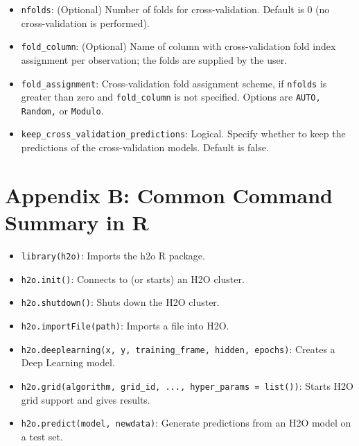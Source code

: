 \begin{itemize}
\item \texttt{nfolds}: (Optional) Number of folds for cross-validation. %
Default is 0 (no cross-validation is performed).

\item \texttt{fold\_column}: (Optional) Name of column with cross-validation fold index assignment per observation; the folds are supplied by the user. 

\item \texttt{fold\_assignment}: Cross-validation fold assignment scheme, if \texttt{nfolds} is greater than zero and \texttt{fold\_column} is not specified. Options are \texttt{AUTO, Random,} or \texttt{Modulo}. 

\item \texttt{keep\_cross\_validation\_predictions}: Logical.  Specify whether to keep the predictions of the cross-validation models.  Default is false.

\end{itemize}




\newpage

\section{Appendix B: Common Command Summary in R}
\begin{itemize}

\item \texttt{library(h2o)}: Imports the h2o R package.

\item \texttt{h2o.init()}:  Connects to (or starts) an H2O cluster.

\item \texttt{h2o.shutdown()}: Shuts down the H2O cluster.

\item \texttt{h2o.importFile(path)}: Imports a file into H2O.

\item \texttt{h2o.deeplearning(x, y, training\_frame, hidden, epochs)}: Creates a Deep Learning model.

\item \texttt{h2o.grid(algorithm, grid\_id, ..., hyper\_params = list())}: Starts H2O grid support and gives results.

\item \texttt{h2o.predict(model, newdata)}: Generate predictions from an H2O model on a test set.

\end{itemize}



